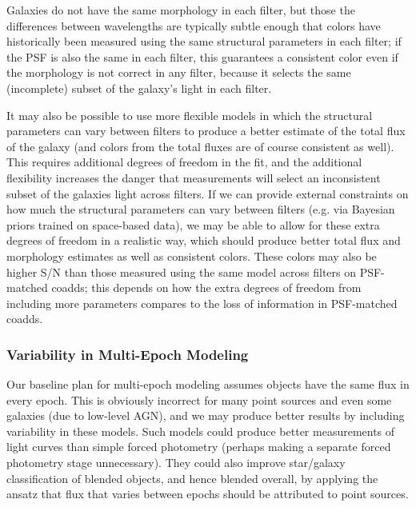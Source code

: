 \documentclass[10pt]{article}
\begin{document}
\label{sec:consistent-galaxy-colors}

Galaxies do not have the same morphology in each filter, but those the
differences between wavelengths are typically subtle enough that colors have
historically been measured using the same structural parameters in each
filter; if the PSF is also the same in each filter, this guarantees a
consistent color even if the morphology is not correct in any filter, because
it selects the same (incomplete) subset of the galaxy's light in each filter.

It may also be possible to use more flexible models in which the structural
parameters can vary between filters to produce a better estimate of the total
flux of the galaxy (and colors from the total fluxes are of course consistent
as well).  This requires additional degrees of freedom in the fit, and the
additional flexibility increases the danger that measurements will select an
inconsistent subset of the galaxies light across filters.  If we can provide
external constraints on how much the structural parameters can vary between
filters (e.g. via Bayesian priors trained on space-based data), we may be able
to allow for these extra degrees of freedom in a realistic way, which should
produce better total flux and morphology estimates as well as consistent
colors.  These colors may also be higher S/N than those measured using the
same model across filters on PSF-matched coadds; this depends on how
the extra degrees of freedom from including more parameters compares to the
loss of information in PSF-matched coadds.

\subsubsection{Variability in Multi-Epoch Modeling}

\label{sec:variable-models}

Our baseline plan for multi-epoch modeling assumes objects have the same flux
in every epoch.  This is obviously incorrect for many point sources and even
some galaxies (due to low-level AGN), and we may produce better results by
including variability in these models.  Such models could produce better
measurements of light curves than simple forced photometry (perhaps making a
separate forced photometry stage unnecessary). They could also improve
star/galaxy classification of blended objects, and hence blended overall,
by applying the ansatz that flux that varies between epochs should be
attributed to point sources.
\end{document}
